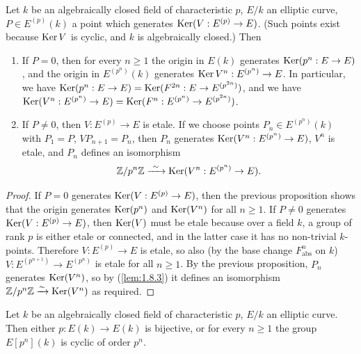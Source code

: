 \begin{kprop}\label{prop:12.3.3}
Let $k$ be an algebraically closed field of characteristic $p$, $E/k$ an elliptic curve, $P \in E^{(p)}(k)$ a point which generates $\operatorname{Ker}(V : E^{(p)} \to E)$. (Such points exist because $\operatorname{Ker} V$ is cyclic, and $k$ is algebraically closed.) Then
\begin{enumerate}[label=(\arabic*)]
\item If $P = 0$, then for every $n \ge 1$ the origin in $E(k)$ generates $\operatorname{Ker}(p^n : E \to E)$, and the origin in $E^{(p^n)}(k)$ generates $\operatorname{Ker} V^n : E^{(p^n)} \to E$. In particular, we have $\operatorname{Ker}(p^n : E \to E) = \operatorname{Ker}(F^{2n} : E \to E^{(p^{2n})})$, and we have $\operatorname{Ker}(V^n : E^{(p^n)} \to E) = \operatorname{Ker}(F^n : E^{(p^n)} \to E^{(p^{2n})})$.
\item If $P \ne 0$, then $V : E^{(p)} \to E$ is etale. If we choose points $P_n \in E^{(p^n)}(k)$ with $P_1 = P$, $V P_{n+1} = P_n$, then $P_n$ generates $\operatorname{Ker}(V^n : E^{(p^n)} \to E)$, $V^n$ is etale, and $P_n$ defines an isomorphism
\[
\mathbb{Z}/p^n\mathbb{Z} \xrightarrow{\ \sim\ } \operatorname{Ker}(V^n : E^{(p^n)} \to E) .
\]
\end{enumerate}
\end{kprop}

\begin{proof}
If $P = 0$ generates $\operatorname{Ker}(V : E^{(p)} \to E)$, then the previous proposition shows that the origin generates $\operatorname{Ker}(p^n)$ and $\operatorname{Ker}(V^n)$ for all $n \ge 1$. If $P \ne 0$ generates $\operatorname{Ker}(V : E^{(p)} \to E)$, then $\operatorname{Ker}(V)$ must be etale because over a field $k$, a group of rank $p$ is either etale or connected, and in the latter case it has no non-trivial $k$-points. Therefore $V : E^{(p)} \to E$ is etale, so also (by the base change $F_{\mathrm{abs}}^n$ on $k$) $V : E^{(p^{n+1})} \to E^{(p^n)}$ is etale for all $n \ge 1$. By the previous proposition, $P_n$ generates $\operatorname{Ker}(V^n)$, so by (\ref{lem:1.8.3}) it defines an isomorphism $\mathbb{Z}/p^n\mathbb{Z} \xrightarrow{\sim} \operatorname{Ker}(V^n)$ as required.
\end{proof}

\begin{kcor}\label{cor:12.3.4}
Let $k$ be an algebraically closed field of characteristic $p$, $E/k$ an elliptic curve. Then either $p : E(k) \to E(k)$ is bijective, or for every $n \ge 1$ the group $E[p^n](k)$ is cyclic of order $p^n$.
\end{kcor}

